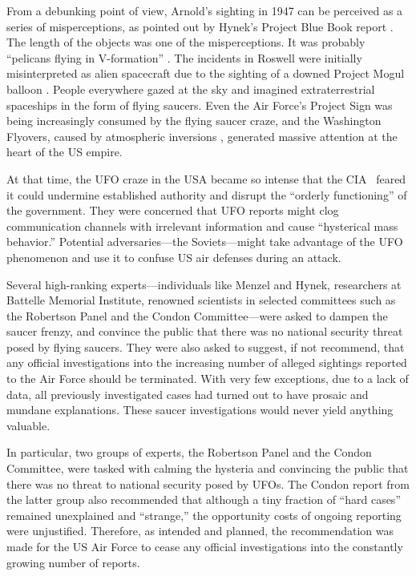 From a debunking point of view, Arnold's sighting in 1947 can be perceived as a series of misperceptions, as pointed out by Hynek's Project Blue Book report \cite{1947-KA-PBB}. The length of the objects was one of the misperceptions. It was probably ``pelicans flying in V-formation'' \cite{Maccabee2017Jun}. The incidents in Roswell were initially misinterpreted as alien spacecraft due to the sighting of a downed Project Mogul balloon \cite{Weaver1995Jan}. People everywhere gazed at the sky and imagined extraterrestrial spaceships in the form of flying saucers. Even the Air Force's Project Sign was being increasingly consumed by the flying saucer craze, and the Washington Flyovers, caused by atmospheric inversions \cite{Menzel_1953}, generated massive attention at the heart of the US empire.

At that time, the UFO craze in the USA became so intense that the CIA~\cite{Haines-CIA-UFO} feared it could undermine established authority
and disrupt the ``orderly functioning'' of the government.
They were concerned that UFO reports might clog communication channels with irrelevant information and cause ``hysterical mass behavior.'' Potential adversaries---the Soviets---might take advantage of the UFO phenomenon
and use it to confuse US air defenses during an attack.

Several high-ranking experts---individuals like Menzel and Hynek, researchers at Battelle Memorial Institute,
renowned scientists in selected committees such as the Robertson Panel and the Condon Committee---were asked to dampen the saucer frenzy, and
convince the public that there was no national security threat posed by flying saucers.
They were also asked to suggest, if not recommend, that any official investigations into the increasing number of
alleged sightings reported to the Air Force should be terminated.
With very few exceptions, due to a lack of data, all previously investigated cases had turned out to have prosaic and mundane explanations.
These saucer investigations would never yield anything valuable.

In particular, two groups of experts, the Robertson Panel and the Condon Committee,
were tasked with calming the hysteria and convincing the public that there was no threat to national security posed by UFOs.
The Condon report from the latter group also recommended that although a tiny fraction of ``hard cases'' remained unexplained and ``strange,'' the opportunity costs of ongoing reporting were unjustified. Therefore, as intended and planned, the recommendation was made for the US Air Force to cease any official investigations into the constantly growing number of reports.

